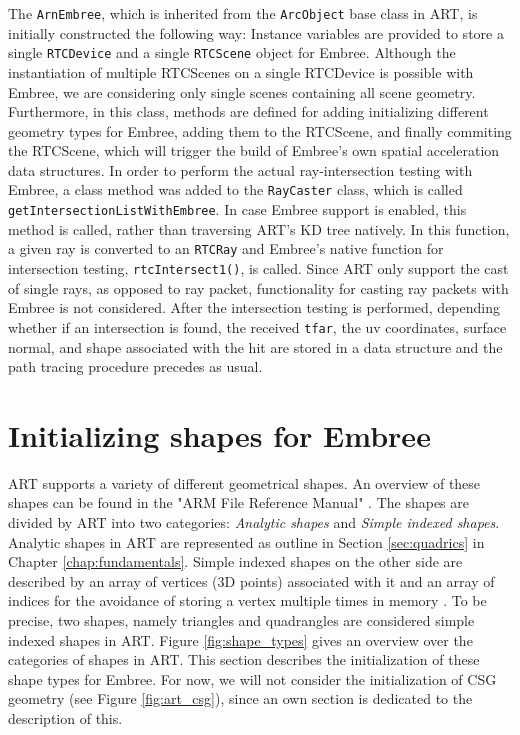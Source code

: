 The \texttt{ArnEmbree}, which is inherited from the \texttt{ArcObject} base class in ART, is initially constructed the following way: Instance variables are provided to store a single \texttt{RTCDevice} and a single \texttt{RTCScene} object for Embree. Although the instantiation of multiple RTCScenes on a single RTCDevice is possible with Embree, we are considering only single scenes containing all scene geometry. Furthermore, in this class, methods are defined for adding initializing different geometry types for Embree, adding them to the RTCScene, and finally commiting the RTCScene, which will trigger the build of Embree's own spatial acceleration data structures. 
In order to perform the actual ray-intersection testing with Embree, a class method was added to the \texttt{RayCaster} class, which is called \texttt{getIntersectionListWithEmbree}. In case Embree support is enabled, this method is called, rather than traversing ART's KD tree natively. In this function, a given ray is converted to an \texttt{RTCRay} and Embree's native function for intersection testing, \texttt{rtcIntersect1()}, is called. Since ART only support the cast of single rays, as opposed to ray packet, functionality for casting ray packets with Embree is not considered. After the intersection testing is performed, depending whether if an intersection is found, the received \texttt{tfar}, the uv coordinates, surface normal, and shape associated with the hit are stored in a  data structure  and the path tracing procedure precedes as usual.

\section{Initializing shapes for Embree}

ART supports a variety of different geometrical shapes. An overview of these shapes can be found in the "ARM File Reference Manual" \cite{artreferencemanual}. The shapes are divided by ART into two categories: \emph{Analytic shapes} and \emph{Simple indexed shapes}. Analytic shapes in ART are represented as outline in Section \ref{sec:quadrics} in Chapter \ref{chap:fundamentals}. Simple indexed shapes on the other side are described by an array of vertices (3D points) associated with it and an array of indices for the avoidance of storing a vertex multiple times in memory . To be precise, two shapes, namely triangles and quadrangles are considered simple indexed shapes in ART. Figure \ref{fig:shape_types} gives an overview over the categories of shapes in ART. This section describes the initialization of these shape types for Embree. For now, we will not consider the initialization of CSG geometry (see Figure \ref{fig:art_csg}), since an own section is dedicated to the description of this.

